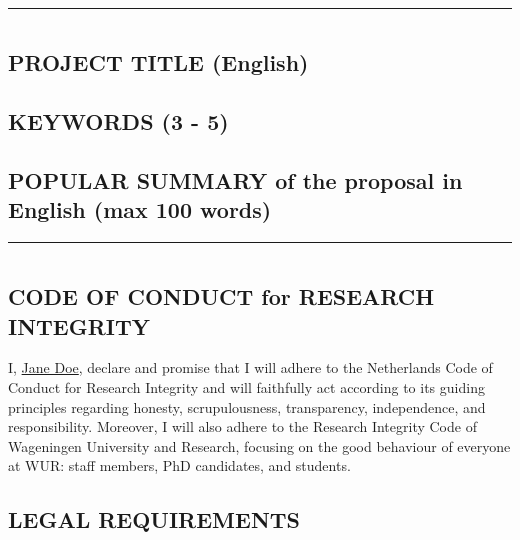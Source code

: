 \documentclass{article}
\begin{document}
\begin{center}
    \rule{\textwidth}{0.5pt}
\end{center}

\section{}

\subsection{PROJECT TITLE (English)}



\subsection{KEYWORDS (3 - 5)}



\subsection{POPULAR SUMMARY of the proposal in English (max 100 words)}


\begin{center}
    \rule{\textwidth}{0.5pt}
\end{center}

\section{}

\subsection{CODE OF CONDUCT for RESEARCH INTEGRITY}

I, \underline{Jane Doe}, declare and promise that I will adhere to the Netherlands Code of Conduct for Research Integrity and will faithfully act according to its guiding principles regarding honesty, scrupulousness, transparency, independence, and responsibility. Moreover, I will also adhere to the Research Integrity Code of Wageningen University and Research, focusing on the good behaviour of everyone at WUR: staff members, PhD candidates, and students.

\subsection{LEGAL REQUIREMENTS}
\end{document}
